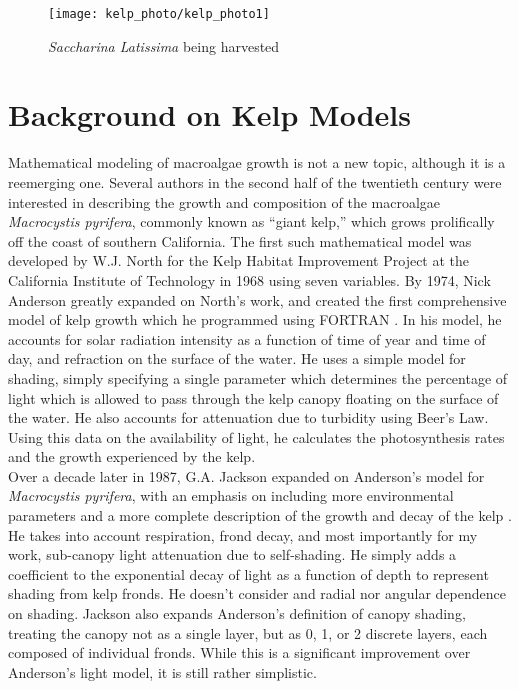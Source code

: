 \begin{figure}[h]
  \centering
  \texttt{[image: kelp\_photo/kelp\_photo1]}
  \caption{\textit{Saccharina Latissima} being harvested}
\end{figure}


\section{Background on Kelp Models}

Mathematical modeling of macroalgae growth is not a new topic, although it is a reemerging one.
Several authors in the second half of the twentieth century were interested in describing the growth and composition of the macroalgae \textit{Macrocystis pyrifera}, commonly known as ``giant kelp,'' which grows prolifically off the coast of southern California.
The first such mathematical model was developed by W.J. North for the Kelp Habitat Improvement Project at the California Institute of Technology in 1968 using seven variables.
By 1974, Nick Anderson greatly expanded on North's work, and created the first comprehensive model of kelp growth which he programmed using FORTRAN \cite{anderson_mathematical_1974}.
In his model, he accounts for solar radiation intensity as a function of time of year and time of day, and refraction on the surface of the water.
He uses a simple model for shading, simply specifying a single parameter which determines the percentage of light which is allowed to pass through the kelp canopy floating on the surface of the water.
He also accounts for attenuation due to turbidity using Beer's Law.
Using this data on the availability of light, he calculates the photosynthesis rates and the growth experienced by the kelp. \\[-0.75em]

Over a decade later in 1987, G.A.
Jackson expanded on Anderson's model for \textit{Macrocystis pyrifera}, with an emphasis on including more environmental parameters and a more complete description of the growth and decay of the kelp \cite{jackson_modelling_1987}. 
He takes into account respiration, frond decay, and most importantly for my work, sub-canopy light attenuation due to self-shading.
He simply adds a coefficient to the exponential decay of light as a function of depth to represent shading from kelp fronds.
He doesn't consider and radial nor angular dependence on shading. %
Jackson also expands Anderson's definition of canopy shading, treating the canopy not as a single layer, but as 0, 1, or 2 discrete layers, each composed of individual fronds.
While this is a significant improvement over Anderson's light model, it is still rather simplistic. \\[-0.75em]

